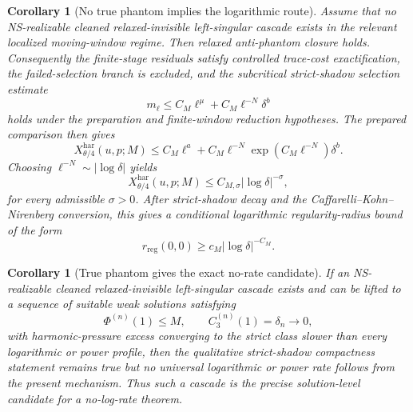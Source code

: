 \documentclass[11pt]{article}
\numberwithin{equation}{section}
\newtheorem{corollary}[theorem]{Corollary}
\begin{document}
\begin{corollary}[No true phantom implies the logarithmic route]\label{cor:no-phantom-implies-log-route}
Assume that no NS-realizable cleaned relaxed-invisible left-singular cascade exists in the relevant
localized moving-window regime.  Then relaxed anti-phantom closure holds.  Consequently the
finite-stage residuals satisfy controlled trace-cost exactification, the failed-selection branch is
excluded, and the subcritical strict-shadow selection estimate
\[
        m_\ell
        \le
        C_M\ell^\mu+C_M\ell^{-N}\delta^b
\]
holds under the preparation and finite-window reduction hypotheses.  The prepared comparison then
gives
\[
        X^{\mathrm{har}}_{\theta/4}(u,p;M)
        \le
        C_M\ell^a
        +
        C_M\ell^{-N}\exp(C_M\ell^{-N})\delta^b.
\]
Choosing \(\ell^{-N}\sim |\log\delta|\) yields
\[
        X^{\mathrm{har}}_{\theta/4}(u,p;M)
        \le
        C_{M,\sigma}|\log\delta|^{-\sigma},
\]
for every admissible \(\sigma>0\).  After strict-shadow decay and the Caffarelli--Kohn--Nirenberg
conversion, this gives a conditional logarithmic regularity-radius bound of the form
\[
        r_{\mathrm{reg}}(0,0)
        \ge
        c_M |\log\delta|^{-C_M}.
\]
\end{corollary}

\begin{corollary}[True phantom gives the exact no-rate candidate]\label{cor:true-phantom-no-rate-candidate}
If an NS-realizable cleaned relaxed-invisible left-singular cascade exists and can be lifted to a
sequence of suitable weak solutions satisfying
\[
        \Phi^{(n)}(1)\le M,
        \qquad
        C_3^{(n)}(1)=\delta_n\to0,
\]
with harmonic-pressure excess converging to the strict class slower than every logarithmic or power
profile, then the qualitative strict-shadow compactness statement remains true but no universal
logarithmic or power rate follows from the present mechanism.  Thus such a cascade is the precise
solution-level candidate for a no-log-rate theorem.
\end{corollary}
\end{document}
